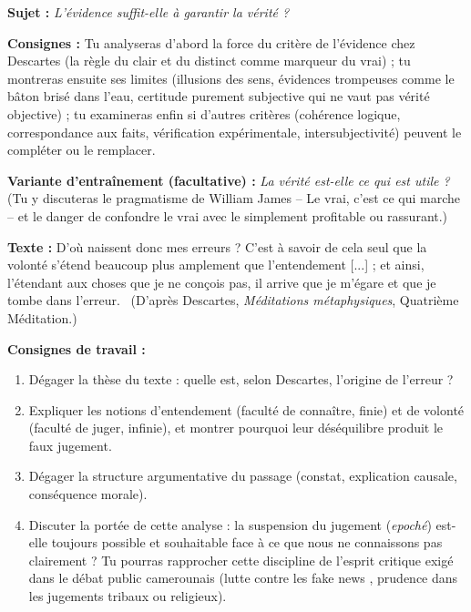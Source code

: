 \documentclass[11pt]{article}
\newcommand{\cle}[1]{{\popxbold\color{popdark}#1}}
\begin{document}
\begin{exercice}
\textbf{Sujet :} \emph{L'évidence suffit-elle à garantir la vérité ?}

\textbf{Consignes :} Tu analyseras d'abord la force du critère de l'évidence chez Descartes (la règle du clair et du distinct comme marqueur du vrai) ; tu montreras ensuite ses limites (illusions des sens, évidences trompeuses comme le bâton brisé dans l'eau, certitude purement subjective qui ne vaut pas vérité objective) ; tu examineras enfin si d'autres critères (cohérence logique, correspondance aux faits, vérification expérimentale, intersubjectivité) peuvent le compléter ou le remplacer.

\textbf{Variante d'entraînement (facultative) :} \emph{La vérité est-elle ce qui est utile ?} (Tu y discuteras le pragmatisme de William James -- \guillemotleft Le vrai, c'est ce qui marche \guillemotright -- et le danger de confondre le vrai avec le simplement profitable ou rassurant.)
\end{exercice}

\begin{exercice}
\textbf{Texte :}
\guillemotleft D'où naissent donc mes erreurs ? C'est à savoir de cela seul que la volonté s'étend beaucoup plus amplement que l'entendement [...] ; et ainsi, l'étendant aux choses que je ne conçois pas, il arrive que je m'égare et que je tombe dans l'erreur. \guillemotright\ (D'après Descartes, \emph{Méditations métaphysiques}, Quatrième Méditation.)

\textbf{Consignes de travail :}
\begin{enumerate}
\item Dégager la thèse du texte : quelle est, selon Descartes, l'origine de l'erreur ?
\item Expliquer les notions d'\cle{entendement} (faculté de connaître, finie) et de \cle{volonté} (faculté de juger, infinie), et montrer pourquoi leur déséquilibre produit le faux jugement.
\item Dégager la structure argumentative du passage (constat, explication causale, conséquence morale).
\item Discuter la portée de cette analyse : la suspension du jugement (\emph{epoché}) est-elle toujours possible et souhaitable face à ce que nous ne connaissons pas clairement ? Tu pourras rapprocher cette discipline de l'esprit critique exigé dans le débat public camerounais (lutte contre les \guillemotleft fake news \guillemotright, prudence dans les jugements tribaux ou religieux).
\end{enumerate}
\end{exercice}
\end{document}
